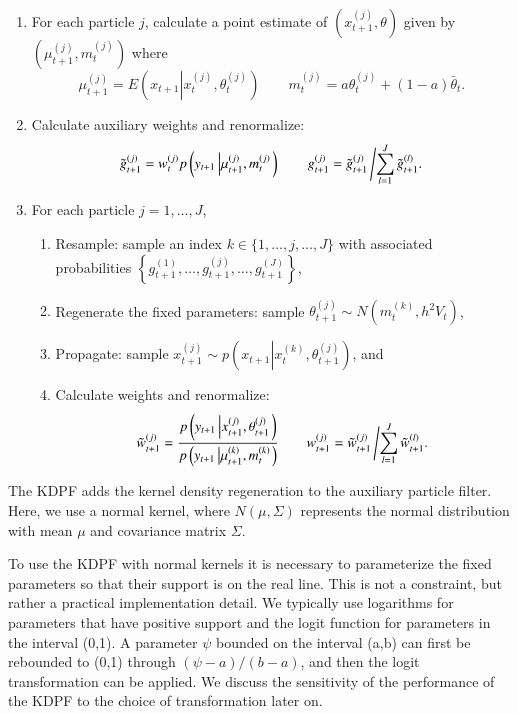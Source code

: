 \documentclass{elsarticle}
\begin{document}
\begin{enumerate}
\item For each particle $j$, calculate a point estimate of $\left(x_{t+1}^{(j)},\theta\right)$ given by $\left(\mu_{t+1}^{(j)},m_t^{(j)}\right)$ where
    \[
    \mu_{t+1}^{(j)} = E\left(x_{t+1}\left|x_t^{(j)},\theta_t^{(j)} \right.\right) \qquad
    m_t^{(j)} = a\theta_t^{(j)} + (1-a)\bar{\theta}_t.
    \]
\item Calculate auxiliary weights and renormalize:
\[ \tilde{g}_{t+1}^{(j)} = w_t^{(j)} p\left(y_{t+1}\left|\mu_{t+1}^{(j)},m_t^{(j)}\right.\right) \qquad g_{t+1}^{(j)} = \tilde{g}_{t+1}^{(j)}\left/ \sum_{l=1}^J \tilde{g}_{t+1}^{(l)}. \right. \]
\item For each particle $j=1,\ldots,J$,
	\begin{enumerate}
    \item Resample: sample an index $k\in\{1,\ldots,j,\ldots,J\}$ with associated probabilities $\left\{g_{t+1}^{(1)},\ldots,g_{t+1}^{(j)},\ldots,g_{t+1}^{(J)}\right\}$,
	\item Regenerate the fixed parameters: sample $\theta_{t+1}^{(j)} \sim N\left( m_t^{(k)}, h^2V_t \right)$,
	\item Propagate: sample $x_{t+1}^{(j)} \sim p\left(x_{t+1}\left|x_t^{(k)},\theta_{t+1}^{(j)}\right.\right)$, and
	\item Calculate weights and renormalize:
	\[ \tilde{w}_{t+1}^{(j)} = \frac{p\left(y_{t+1}\left|x_{t+1}^{(j)},\theta_{t+1}^{(j)}\right.\right)}{p\left(y_{t+1}\left|\mu_{t+1}^{(k)},m_t^{(k)}\right.\right)}
	\qquad
	w_{t+1}^{(j)} = \tilde{w}_{t+1}^{(j)}\left/\sum_{l=1}^J \tilde{w}_{t+1}^{(l)}. \right. \]
	\end{enumerate}
\end{enumerate}

\noindent The KDPF adds the kernel density regeneration to the auxiliary particle filter. Here, we use a normal kernel, where $N(\mu,\Sigma)$ represents the normal distribution with mean $\mu$ and covariance matrix $\Sigma$.

To use the KDPF with normal kernels it is necessary to parameterize the fixed parameters so that their support is on the real line. This is not a constraint, but rather a practical implementation detail. We typically use logarithms for parameters that have positive support and the logit function for parameters in the interval (0,1). A parameter $\psi$ bounded on the interval (a,b) can first be rebounded to (0,1) through $(\psi-a)/(b-a)$, and then the logit transformation can be applied. We discuss the sensitivity of the performance of the KDPF to the choice of transformation later on.
\end{document}
